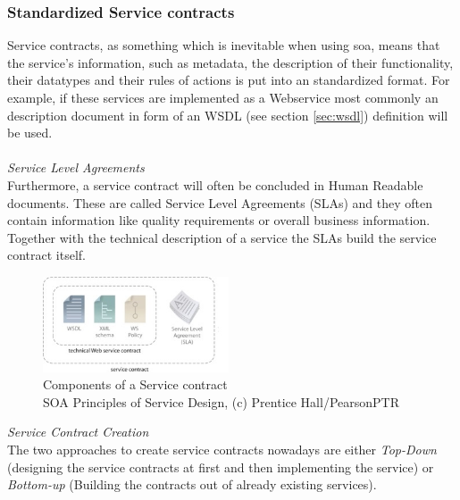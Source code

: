 \documentclass[12pt]{article}
\begin{document}
\subsubsection{Standardized Service contracts}
\label{sec:StandardizedServicecontracts}
Service contracts, as something which is inevitable when using \gls{soa}, means that the service's information, such as metadata, the description of their functionality, their datatypes and their rules of actions is put into an standardized format. \cite[page 86]{te} 
For example, if these services are implemented as a Webservice most commonly an description document in form of an WSDL (see section \ref{sec:wsdl}) definition will be used. \\\\ 
\noindent\textit{Service Level Agreements} \\
Furthermore, a service contract will often be concluded in Human Readable documents. These are called Service Level Agreements (SLAs) and they often contain information like quality requirements or overall business information. \\ 
Together with the technical description of a service the SLAs build the service contract itself.
\begin{figure}[here!]
	\centering
	\includegraphics[width=0.49\textwidth]{images/soajuhu}
	\caption{Components of a Service contract \cite{photos}\\ SOA Principles of Service Design, (c) Prentice Hall/PearsonPTR }
	\label{fig:servicecontractcomponents}
	\end{figure} \FloatBarrier
\noindent 
\textit{Service Contract Creation} \\
The two approaches to create service contracts nowadays are either \textit{Top-Down} (designing the service contracts at first and then implementing the service) or \textit{Bottom-up} (Building the contracts out of already existing services). \cite[page 151,152]{grau}\\
\end{document}
